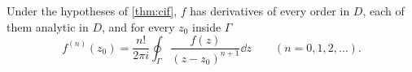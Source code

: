 \begin{theorem}\label{thm:cif-derivatives}
  Under the hypotheses of \cref{thm:cif}, $f$ has derivatives of every order
  in $D$, each of them analytic in $D$, and for every $z_0$ inside $\Gamma$
  \[
    f^{(n)}(z_0) = \frac{n!}{2\pi i} \oint_\Gamma \frac{f(z)}{(z - z_0)^{n+1}} \dd z
    \qquad (n = 0, 1, 2, \dots).
  \]
\end{theorem}
